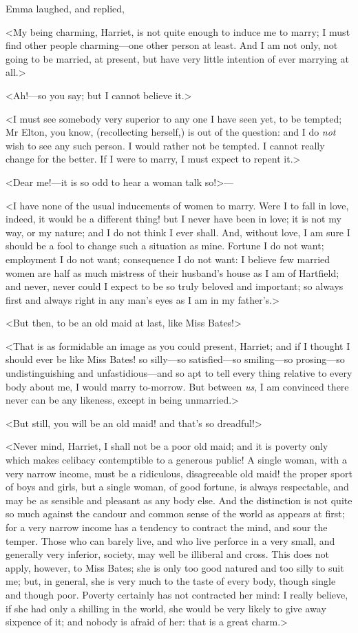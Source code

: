 Emma laughed, and replied,

<My being charming, Harriet, is not quite enough to induce me to marry; I must find other people charming—one other person at least. And I am not only, not going to be married, at present, but have very little intention of ever marrying at all.>

<Ah!—so you say; but I cannot believe it.>

<I must see somebody very superior to any one I have seen yet, to be tempted; Mr Elton, you know, (recollecting herself,) is out of the question: and I do \textit{not} wish to see any such person. I would rather not be tempted. I cannot really change for the better. If I were to marry, I must expect to repent it.>

<Dear me!—it is so odd to hear a woman talk so!>—

<I have none of the usual inducements of women to marry. Were I to fall in love, indeed, it would be a different thing! but I never have been in love; it is not my way, or my nature; and I do not think I ever shall. And, without love, I am sure I should be a fool to change such a situation as mine. Fortune I do not want; employment I do not want; consequence I do not want: I believe few married women are half as much mistress of their husband's house as I am of Hartfield; and never, never could I expect to be so truly beloved and important; so always first and always right in any man's eyes as I am in my father's.>

<But then, to be an old maid at last, like Miss Bates!>

<That is as formidable an image as you could present, Harriet; and if I thought I should ever be like Miss Bates! so silly—so satisfied—so smiling—so prosing—so undistinguishing and unfastidious—and so apt to tell every thing relative to every body about me, I would marry to-morrow. But between \textit{us}, I am convinced there never can be any likeness, except in being unmarried.>

<But still, you will be an old maid! and that's so dreadful!>

<Never mind, Harriet, I shall not be a poor old maid; and it is poverty only which makes celibacy contemptible to a generous public! A single woman, with a very narrow income, must be a ridiculous, disagreeable old maid! the proper sport of boys and girls, but a single woman, of good fortune, is always respectable, and may be as sensible and pleasant as any body else. And the distinction is not quite so much against the candour and common sense of the world as appears at first; for a very narrow income has a tendency to contract the mind, and sour the temper. Those who can barely live, and who live perforce in a very small, and generally very inferior, society, may well be illiberal and cross. This does not apply, however, to Miss Bates; she is only too good natured and too silly to suit me; but, in general, she is very much to the taste of every body, though single and though poor. Poverty certainly has not contracted her mind: I really believe, if she had only a shilling in the world, she would be very likely to give away sixpence of it; and nobody is afraid of her: that is a great charm.>

